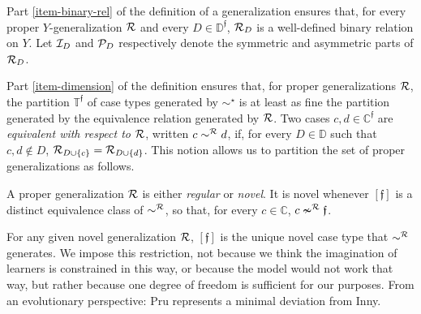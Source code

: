 \documentclass[12pt,a4paper,twoside]{article}
\newcommand{\novel}{\mathfrak f}
\newcommand{\Ext}{\operatorname{ext}}
\newcommand{\preceqb}{\mathbin{\preceq}}
\newcommand{\ext}{\mathrel{\mc R}}
\newcommand{\sext}{\mathrel{\mc P}}
\newcommand{\next}{\mathrel{\mc I}}
\newcommand{\supext}{{\ext}}
\newcommand{\extb}{\mathbin{\mc R}}
\newcommand{\mbbd}{{\mathds D}}
\newcommand{\mbbdp}{{\mathds D^{\novel}}}
\newcommand{\mbbc}{{\mathds C}}
\newcommand{\mbbcp}{{\mathds C^{\novel}}}
\newcommand{\mbbtp}{{\mathds{T} ^ \novel }}
\begin{document}
Part \ref{item-binary-rel} of the definition of a {generalization} ensures that, for
every proper $Y$-{generalization} $\ext$ and every $D\in \mbbdp$, $\ext_{D}$ is a
well-defined binary relation on $Y$.  Let $\next_{D}$ and $\sext_{D}$
respectively denote the symmetric and asymmetric parts of $\ext_{D}$.


Part \ref{item-dimension} of the definition ensures that, for proper {generalization}s
$\ext$, the partition $\mbbtp$ of case types generated by $\sim^{\star}$ is at
least as fine the partition generated by the equivalence relation generated by
$\ext$. Two cases $c,d \in \mbbcp$ are \emph{equivalent with respect to
  $\ext$}, written $c \sim^{\extb} d$, if, for every $D \in \mbbd$ such
that $c,d \notin D$, $\extb _ { D \cup \{c\} } = \extb _ { D \cup\{d\} }$.
This notion allows us to partition the set of proper {generalization}s as follows.


\begin{definition*}\label{def-novel}

  A proper {generalization} $\ext$ is either \emph{regular} or \emph{novel}.  It is
  novel whenever $[\novel]$ is a distinct equivalence class of $\sim^{\supext}$,
  so that, for every $c \in \mbbc$, $c \nsim ^ \supext \novel$.

\end{definition*}



For any given novel {generalization} $\ext$, $[\novel]$ is the unique novel case type
that $\sim^{\extb}$ generates.  We impose this restriction, not because we
think the imagination of learners is constrained in this way, or because the
model would not work that way, but rather because one degree of freedom is
sufficient for our purposes. From an evolutionary perspective: {Pru} represents
a minimal deviation from Inny.
\end{document}
